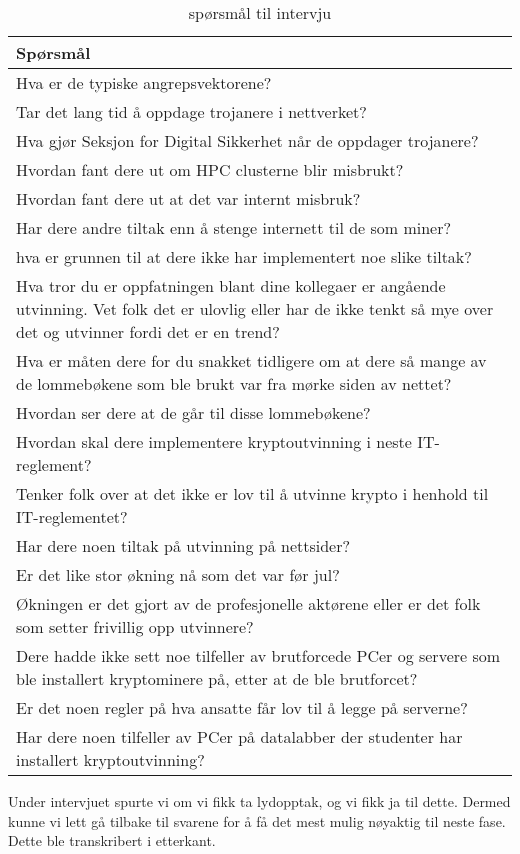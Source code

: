 \begin{table}[H]
    \centering
    \begin{tabular}{|m{30em}|} 
        \hline
             \cellcolor{yellow} Spørsmål  \\
        \hline
          Hva er de typiske angrepsvektorene?  \\
         \hline
         Tar det lang tid å oppdage trojanere i nettverket? \\ 
         \hline
         Hva gjør Seksjon for Digital Sikkerhet når de oppdager trojanere? \\
         \hline
         Hvordan fant dere ut om HPC clusterne blir misbrukt? \\
         \hline
         Hvordan fant dere ut at det var internt misbruk?\\
         \hline
         Har dere andre tiltak enn å stenge internett til de som miner? \\
         \hline
         hva er grunnen til at dere ikke har implementert noe slike tiltak? \\
         \hline
         Hva tror du er oppfatningen blant dine kollegaer er angående utvinning. Vet folk det er ulovlig eller har de ikke tenkt så mye over det og utvinner fordi det er en trend? \\
         \hline
         Hva er måten dere for du snakket tidligere om at dere så mange av de lommebøkene som ble brukt var fra mørke siden av nettet?  \\
         \hline
         Hvordan ser dere at de går til disse lommebøkene? \\
         \hline
         Hvordan skal dere implementere kryptoutvinning i neste IT-reglement? \\
          \hline
         Tenker folk over at det ikke er lov til å utvinne krypto i henhold til IT-reglementet? \\
          \hline
         Har dere noen tiltak på utvinning på nettsider? \\
          \hline
         Er det like stor økning nå som det var før jul? \\
          \hline
         Økningen er det gjort av de profesjonelle aktørene eller er det folk som setter frivillig opp utvinnere? \\
          \hline
         Dere hadde ikke sett noe tilfeller av brutforcede PCer og servere som ble installert kryptominere på, etter at de ble brutforcet?  \\
          \hline
         Er det noen regler på hva ansatte får lov til å legge på serverne? \\
          \hline
         Har dere noen tilfeller av PCer på datalabber der studenter har installert kryptoutvinning?
          \hline
    \end{tabular}
    \caption[Spørsmål]{spørsmål til intervju}
    \label{tab:spm-intervju}
\end{table}
Under intervjuet spurte vi om vi fikk ta lydopptak, og vi fikk ja til dette. Dermed kunne vi lett gå tilbake til svarene for å få det mest mulig nøyaktig til neste fase. Dette ble transkribert i etterkant. 

